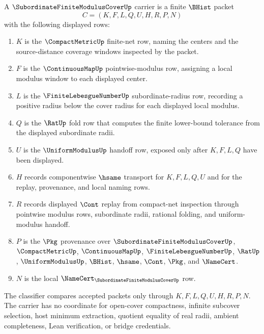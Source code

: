 \begin{definition}
\label{def:subordinate-finite-modulus-cover-carrier}
A $\SubordinateFiniteModulusCoverUp$ carrier is a finite $\BHist$ packet
$$
C=(K,F,L,Q,U,H,R,P,N)
$$
with the following displayed rows:
\begin{enumerate}
\item $K$ is the $\CompactMetricUp$ finite-net row, naming the centers and the source-distance coverage windows inspected by the packet.
\item $F$ is the $\ContinuousMapUp$ pointwise-modulus row, assigning a local modulus window to each displayed center.
\item $L$ is the $\FiniteLebesgueNumberUp$ subordinate-radius row, recording a positive radius below the cover radius for each displayed local modulus.
\item $Q$ is the $\RatUp$ fold row that computes the finite lower-bound tolerance from the displayed subordinate radii.
\item $U$ is the $\UniformModulusUp$ handoff row, exposed only after $K,F,L,Q$ have been displayed.
\item $H$ records componentwise $\hsame$ transport for $K,F,L,Q,U$ and for the replay, provenance, and local naming rows.
\item $R$ records displayed $\Cont$ replay from compact-net inspection through pointwise modulus rows, subordinate radii, rational folding, and uniform-modulus handoff.
\item $P$ is the $\Pkg$ provenance over $\SubordinateFiniteModulusCoverUp$, $\CompactMetricUp$, $\ContinuousMapUp$, $\FiniteLebesgueNumberUp$, $\RatUp$, $\UniformModulusUp$, $\BHist$, $\hsame$, $\Cont$, $\Pkg$, and $\NameCert$.
\item $N$ is the local $\NameCert_{\SubordinateFiniteModulusCoverUp}$ row.
\end{enumerate}
The classifier compares accepted packets only through $K,F,L,Q,U,H,R,P,N$. The carrier has no coordinate for open-cover compactness, infinite subcover selection, host minimum extraction, quotient equality of real radii, ambient completeness, Lean verification, or bridge credentials.
\end{definition}

